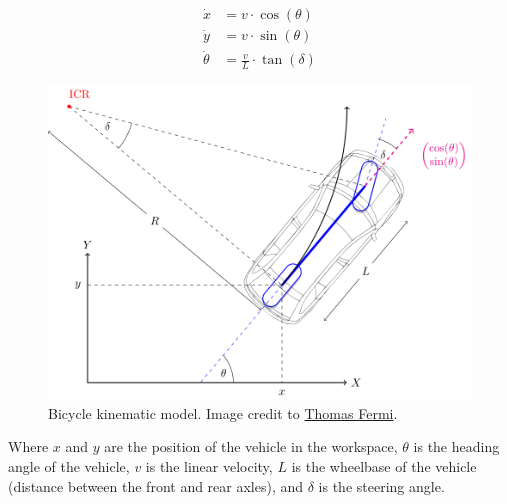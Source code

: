 \begin{figure}[H]

    \begin{minipage}{0.30\textwidth}

        \begin{equation}
            \begin{aligned}
                \dot{x}      & = v \cdot \cos(\theta)           \\
                \dot{y}      & = v \cdot \sin(\theta)           \\
                \dot{\theta} & = \frac{v}{L} \cdot \tan(\delta)
            \end{aligned}
        \end{equation}

    \end{minipage}
    \hfill
    \begin{minipage}{0.50\textwidth}

        \centering
        \includegraphics[width=1.0\textwidth]{./img/bicycle_model.png}

    \end{minipage}

    \caption{Bicycle kinematic model. Image credit to \href{https://thomasfermi.github.io/Algorithms-for-Automated-Driving/Control/BicycleModel.html}{Thomas Fermi}.}
    \label{fig:bicycle_model}

\end{figure}

Where $x$ and $y$ are the position of the vehicle in the workspace, $\theta$ is the heading angle of the vehicle, $v$ is the linear velocity, $L$ is the wheelbase of the vehicle (distance between the front and rear axles), and $\delta$ is the steering angle.

